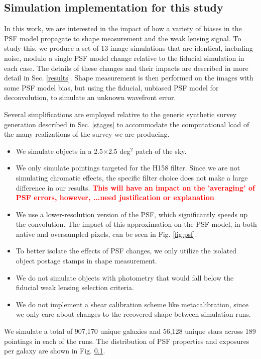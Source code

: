 \documentclass[aps,prd, amsmath,amssymb,superscriptaddress,showkeys,nofootinbib,reprint,preprintnumbers]{revtex4-1}
\newcommand{\verify}[1]{\textcolor{red}{\textbf{{#1}}}}
\begin{document}
\subsection{Simulation implementation for this study}

In this work, we are interested in the impact of how a variety of biases in the PSF model propagate to shape measurement and the weak lensing signal. 
To study this, we produce a set of 13 image simulations that are identical, including noise, modulo a single PSF model change relative to the fiducial simulation in each case. 
The details of these changes and their impacts are described in more detail in Sec. \ref{results}. 
Shape measurement is then performed on the images with some PSF model bias, but using the fiducial, unbiased PSF model for deconvolution, to simulate an unknown wavefront error.

Several simplifications are employed relative to the generic synthetic survey generation described in Sec. \ref{stages} to accommodate the computational load of the many realizations of the survey we are producing. 
\begin{itemize}
\item We simulate objects in a 2.5$\times$2.5 deg$^2$ patch of the sky.
\item We only simulate pointings targeted for the H158 filter. 
Since we are not simulating chromatic effects, the specific filter choice does not make a large difference in our results. 
\verify{This will have an impact on the 'averaging' of PSF errors, however, ...need justification or explanation} 
\item We use a lower-resolution version of the PSF, which significantly speeds up the convolution.
The impact of this approximation on the PSF model, in both native and oversampled pixels, can be seen in Fig. \ref{fig:psf}. 
\item To better isolate the effects of PSF changes, we only utilize the isolated object postage stamps in shape measurement.
\item We do not simulate objects with photometry that would fall below the fiducial weak lensing selection criteria.
\item We do not implement a shear calibration scheme like metacalibration, since we only care about changes to the recovered shape between simulation runs.
\end{itemize}

We simulate a total of 907,170 unique galaxies and 56,128 unique stars across 189 pointings in each of the runs. The distribution of PSF properties and exposures per galaxy are shown in Fig. \ref{}.
\end{document}
